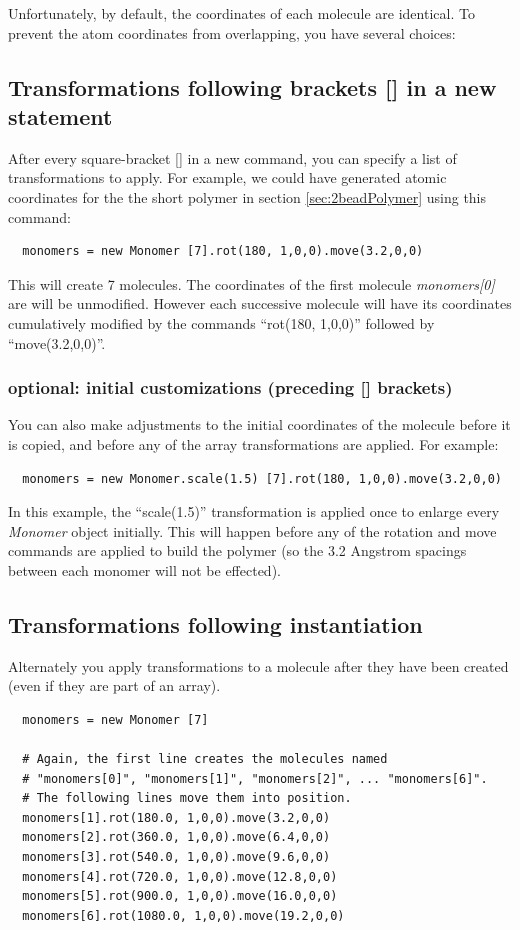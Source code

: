 \documentclass[11pt]{article}
\begin{document}
Unfortunately, by default, the coordinates of each molecule are identical.
To prevent the atom coordinates from overlapping, you have several choices:

\subsection{Transformations following brackets [] in a new statement}
\label{sec:arrays+xform}
   After every square-bracket [] in a new command,
you can specify a list of transformations to apply.
For example, we could have generated atomic coordinates for the 
the short polymer in section \ref{sec:2beadPolymer}
using this command:
\begin{verbatim}
  monomers = new Monomer [7].rot(180, 1,0,0).move(3.2,0,0)
\end{verbatim}
This will create 7 molecules.  
The coordinates of the first molecule \textit{monomers[0]} are will be unmodified.
However each successive molecule will have its coordinates cumulatively
modified by the commands ``rot(180, 1,0,0)'' followed by ``move(3.2,0,0)''.
\subsubsection*{optional: initial customizations (preceding [] brackets)}
\label{sec:xform+arrays+xform} 
You can also make adjustments to the initial coordinates of the molecule
before it is copied, and before any of the array transformations are applied.
For example:
\begin{verbatim}
  monomers = new Monomer.scale(1.5) [7].rot(180, 1,0,0).move(3.2,0,0)
\end{verbatim}
In this example, the ``scale(1.5)'' transformation is applied once to 
enlarge every \textit{Monomer} object initially.
This will happen before any of the rotation and move commands 
are applied to build the polymer
(so the 3.2 Angstrom spacings between each monomer will not be effected).

\subsection{Transformations following instantiation}
\label{sec:xform_after_instance}
Alternately you apply transformations to a molecule 
after they have been created (even if they are part of an array).
\begin{verbatim}
  monomers = new Monomer [7]

  # Again, the first line creates the molecules named 
  # "monomers[0]", "monomers[1]", "monomers[2]", ... "monomers[6]".
  # The following lines move them into position.
  monomers[1].rot(180.0, 1,0,0).move(3.2,0,0)
  monomers[2].rot(360.0, 1,0,0).move(6.4,0,0)
  monomers[3].rot(540.0, 1,0,0).move(9.6,0,0)
  monomers[4].rot(720.0, 1,0,0).move(12.8,0,0)
  monomers[5].rot(900.0, 1,0,0).move(16.0,0,0)
  monomers[6].rot(1080.0, 1,0,0).move(19.2,0,0)
\end{verbatim}
\end{document}
